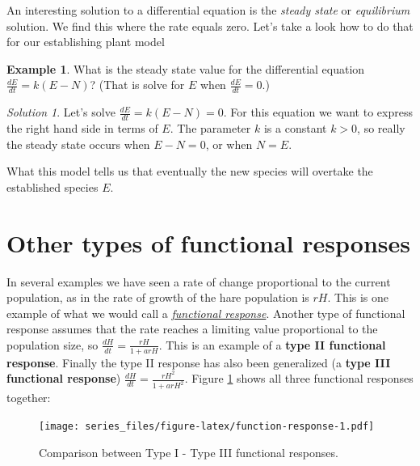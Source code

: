 \documentclass[
]{book}
\theoremstyle{definition}
\theoremstyle{definition}
\newtheorem{example}{Example}[chapter]
\theoremstyle{definition}
\theoremstyle{remark}
\newtheorem*{solution}{Solution}
\begin{document}
An interesting solution to a differential equation is the \emph{steady state} or \emph{equilibrium} solution. We find this where the rate equals zero. Let's take a look how to do that for our establishing plant model

\begin{example}
\protect\hypertarget{exm:unnamed-chunk-52}{}{\label{exm:unnamed-chunk-52} }What is the steady state value for the differential equation \(\displaystyle \frac{dE}{dt} = k(E-N)\)? (That is solve for \(E\) when \(\displaystyle \frac{dE}{dt} = 0\).)
\end{example}

\begin{solution}
{}Let's solve \(\displaystyle \frac{dE}{dt} = k(E-N) = 0\). For this equation we want to express the right hand side in terms of \(E\). The parameter \(k\) is a constant \(k > 0\), so really the steady state occurs when \(E-N = 0\), or when \(N = E\).
\end{solution}

What this model tells us that eventually the new species will overtake the established species \(E\).

\hypertarget{other-types-of-functional-responses}{%
\section{Other types of functional responses}\label{other-types-of-functional-responses}}

In several examples we have seen a rate of change proportional to the current population, as in the rate of growth of the hare population is \(rH\). This is one example of what we would call a \href{https://en.wikipedia.org/wiki/Functional_response}{\emph{functional response}}. Another type of functional response assumes that the rate reaches a limiting value proportional to the population size, so \(\displaystyle \frac{dH}{dt} = \frac{rH}{1+arH}\). This is an example of a \textbf{type II functional response}. Finally the type II response has also been generalized (a \textbf{type III functional response}) \(\displaystyle \frac{dH}{dt} = \frac{rH^{2}}{1+arH^{2}}\). Figure \ref{fig:function-response} shows all three functional responses together:

\begin{figure}
\centering
\texttt{[image: series\_files/figure-latex/function-response-1.pdf]}
\caption{\label{fig:function-response}Comparison between Type I - Type III functional responses.}
\end{figure}
\end{document}
